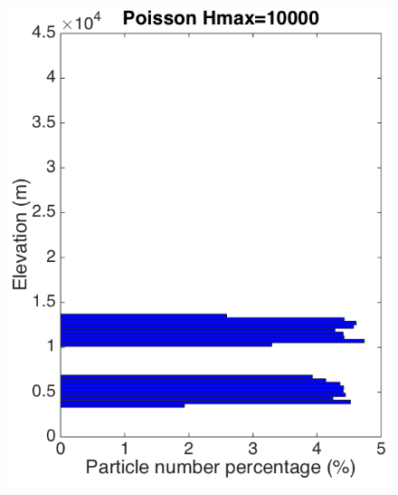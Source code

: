 \begin{figure}[!htb]
    \centering
    \begin{minipage}{.247 \textwidth}
        \centering
        \includegraphics[width=0.99 \textwidth]{Chapter-7/Figures/Possion-Hmax10k-ParticleDis-z}
    \end{minipage}%
    \begin{minipage}{.247 \textwidth}
        \centering

\end{minipage}
\end{figure}
